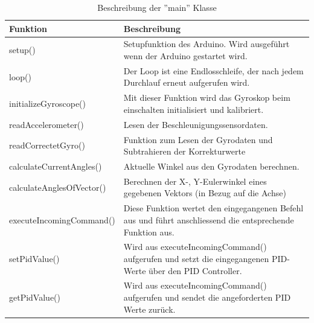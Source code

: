 \begin{table}[H]
  \centering
  \settowidth{}
  \setlength\extrarowheight{2pt}
  \begin{tabulary}{1.0\textwidth}{|L|L|}
    \hline
    \textbf{Funktion} &
    \textbf{Beschreibung}\\
    \hline
    setup() &
    Setupfunktion des Arduino. Wird ausgeführt wenn der Arduino gestartet wird.\\
    \hline
    loop() &
    Der Loop ist eine Endlosschleife, der nach jedem Durchlauf erneut aufgerufen wird.\\
    \hline
    initializeGyroscope() &
    Mit dieser Funktion wird das Gyroskop beim einschalten initialisiert und kalibriert.\\
    \hline
    readAccelerometer() & 
    Lesen der Beschleunigungssensordaten.\\
    \hline
    readCorrectetGyro() & 
    Funktion zum Lesen der Gyrodaten und Subtrahieren der Korrekturwerte\\
    \hline
    calculateCurrentAngles() & 
    Aktuelle Winkel aus den Gyrodaten berechnen.\\
    \hline
    calculateAnglesOfVector() & 
    Berechnen der X-, Y-Eulerwinkel eines gegebenen Vektors (in Bezug auf die Achse) \\
    \hline
    executeIncomingCommand() &
    Diese Funktion wertet den eingegangenen Befehl aus und führt anschliessend die entsprechende Funktion aus.\\
    \hline
    setPidValue() &
    Wird aus executeIncomingCommand() aufgerufen und setzt die eingegangenen PID-Werte über den PID Controller.\\
    \hline
    getPidValue() &
    Wird aus executeIncomingCommand() aufgerufen und sendet die angeforderten PID Werte zurück.\\
    \hline
  \end{tabulary}
  \caption{Beschreibung der ''main'' Klasse}
\end{table}

\newpage
